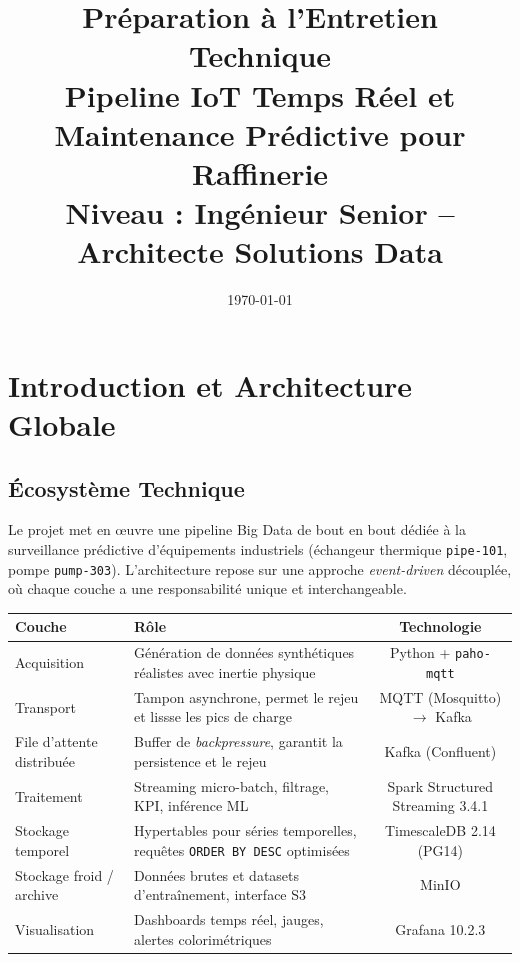\documentclass[11pt,a4paper]{article}
\title{\vspace{-2cm}\textbf{Préparation à l'Entretien Technique}\\[0.3em]
\large Pipeline IoT Temps Réel et Maintenance Prédictive pour Raffinerie\\[0.2em]
\small Niveau : Ingénieur Senior -- Architecte Solutions Data}
\author{}
\date{\today}
\begin{document}
\maketitle
\thispagestyle{empty}
\vspace{1cm}

\begin{center}
\end{center}

\newpage
\tableofcontents
\newpage

\section{Introduction et Architecture Globale}

\subsection{Écosystème Technique}

Le projet met en œuvre une pipeline Big Data de bout en bout dédiée à la surveillance prédictive d'équipements industriels (échangeur thermique \texttt{pipe-101}, pompe \texttt{pump-303}). L'architecture repose sur une approche \emph{event-driven} découplée, où chaque couche a une responsabilité unique et interchangeable.

\begin{center}
\small
\begin{tabularx}{\textwidth}{|l|X|c|}
\hline
\textbf{Couche} & \textbf{Rôle} & \textbf{Technologie} \\
\hline
Acquisition & Génération de données synthétiques réalistes avec inertie physique & Python + \texttt{paho-mqtt} \\
\hline
Transport & Tampon asynchrone, permet le rejeu et lissse les pics de charge & MQTT (Mosquitto) $\rightarrow$ Kafka \\
\hline
File d'attente distribuée & Buffer de \emph{backpressure}, garantit la persistence et le rejeu & Kafka (Confluent) \\
\hline
Traitement & Streaming micro-batch, filtrage, KPI, inférence ML & Spark Structured Streaming 3.4.1 \\
\hline
Stockage temporel & Hypertables pour séries temporelles, requêtes \texttt{ORDER BY DESC} optimisées & TimescaleDB 2.14 (PG14) \\
\hline
Stockage froid / archive & Données brutes et datasets d'entraînement, interface S3 & MinIO \\
\hline
Visualisation & Dashboards temps réel, jauges, alertes colorimétriques & Grafana 10.2.3 \\
\hline
\end{tabularx}
\end{center}
\end{document}
